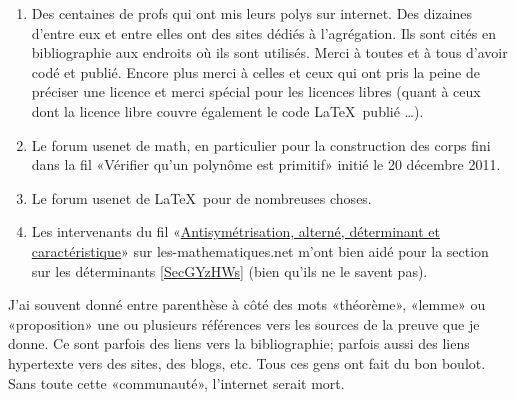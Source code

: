 \begin{enumerate}
    \item
        Des centaines de profs qui ont mis leurs polys sur internet. Des dizaines d'entre eux et entre elles ont des sites dédiés à l'agrégation. Ils sont cités en bibliographie aux endroits où ils sont utilisés. Merci à toutes et à tous d'avoir codé et publié. Encore plus merci à celles et ceux qui ont pris la peine de préciser une licence et merci spécial pour les licences libres (quant à ceux dont la licence libre couvre également le code \LaTeX\ publié \ldots).
    \item
        Le forum usenet de math, en particulier pour la construction des corps fini dans la fil «Vérifier qu'un polynôme est primitif» initié le 20 décembre 2011.
    \item
        Le forum usenet de \LaTeX\ pour de nombreuses choses.
    \item
        Les intervenants du fil «\href{http://www.les-mathematiques.net/phorum/read.php?2,302266}{Antisymétrisation, alterné, déterminant et caractéristique}» sur les-mathematiques.net m'ont bien aidé pour la section sur les déterminants \ref{SecGYzHWs} (bien qu'ils ne le savent pas).
\end{enumerate}

J'ai souvent donné entre parenthèse à côté des mots «théorème», «lemme» ou «proposition» une ou plusieurs références vers les sources de la preuve que je donne. Ce sont parfois des liens vers la bibliographie; parfois aussi des liens hypertexte vers des sites, des blogs, etc. Tous ces gens ont fait du bon boulot. Sans toute cette «communauté», l'internet serait mort.

